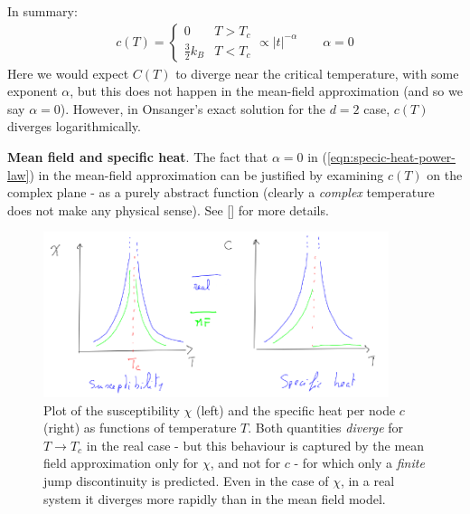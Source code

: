 \documentclass[../../main.tex]{subfiles}
\begin{document}
In summary: %
\begin{align}\label{eqn:specific-heat-power-law}
    c(T) = \begin{cases}
        0 & T > T_c\\
        \frac{3}{2}k_B & T<T_c 
    \end{cases} \propto |t|^{-\alpha} \qquad \alpha = 0 
\end{align} 
Here we would expect $C(T)$ to diverge near the critical temperature, with some exponent $\alpha$, but this does not happen in the mean-field approximation (and so we say $\alpha=0$). However, in Onsanger's exact solution for the $d=2$ case, $c(T)$ diverges logarithmically. 

\begin{appr}\textbf{Mean field and specific heat}. The fact that $\alpha=0$ in (\ref{eqn:specic-heat-power-law}) in the mean-field approximation can be justified by examining $c(T)$ on the complex plane - as a purely abstract function (clearly a \textit{complex} temperature does not make any physical sense). See [] %
for more details.
\end{appr}

\begin{figure}[H]
    \centering
    \includegraphics[width=0.9\textwidth]{chi-cv.png}
    \caption{Plot of the susceptibility $\chi$ (left) and the specific heat per node $c$ (right) as functions of temperature $T$. Both quantities \textit{diverge} for $T \to T_c$ in the real case - but this behaviour is captured by the mean field approximation only for $\chi$, and not for $c$ - for which only a \textit{finite} jump discontinuity is predicted. Even in the case of $\chi$, in a real system it diverges more rapidly than in the mean field model.}
    \label{fig:chi-cv}
\end{figure}
\end{document}

